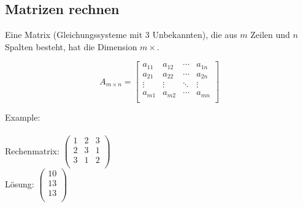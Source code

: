 \newpage
\subsection{Matrizen rechnen}

\hfill \break
Eine Matrix (Gleichungssysteme mit 3 Unbekannten), die aus $m$ Zeilen und $n$ Spalten besteht, hat die Dimension $m\times$.

\hfill \break
\[
    A_{m\times n} =
    \left[ {\begin{array}{cccc}
                    a_{11} & a_{12} & \cdots & a_{1n} \\
                    a_{21} & a_{22} & \cdots & a_{2n} \\
                    \vdots & \vdots & \ddots & \vdots \\
                    a_{m1} & a_{m2} & \cdots & a_{mn} \\
                \end{array} } \right]
\]

\hfill \break
Example:\\
\fboxrule=0.8pt \\

\hfill \break
Rechenmatrix:
$\left(\begin{array}{cccc}
            1 & 2 & 3 \\
            2 & 3 & 1 \\
            3 & 1 & 2 \\
        \end{array}\right)$\\

\hfill \break
Lösung:
$\left(\begin{array}{ccccc}
            10 \\
            13 \\
            13 \\
        \end{array}\right)$\\

